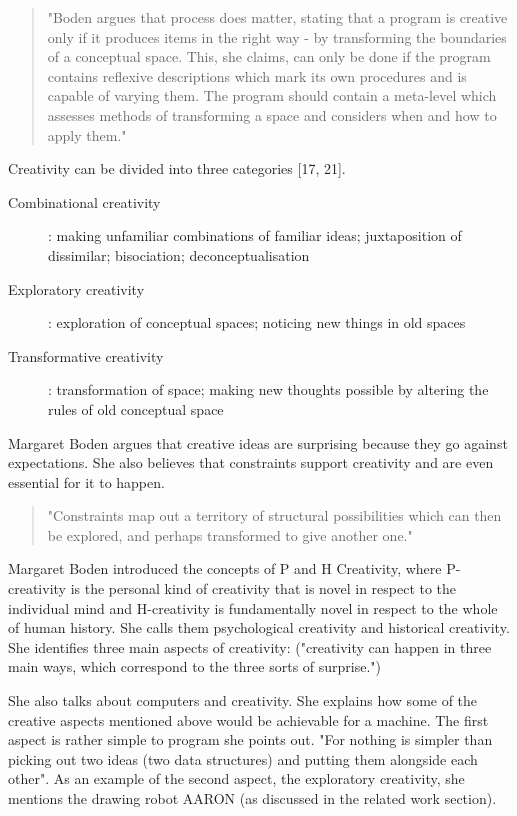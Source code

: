 \begin{quote}
  "Boden argues that process does matter, stating that a program is creative only if it produces items in the right way - by transforming the boundaries of a conceptual space. This, she claims, can only be done if the program contains reflexive descriptions which mark its own procedures and is capable of varying them. The program should contain a meta-level which assesses methods of transforming a space and considers when and how to apply them."  \citep[p.8]{Pease2001}
\end{quote}

Creativity can be divided into three categories \citep{Boden2003}[17, 21].

\begin{description}
  \item [Combinational creativity]: making unfamiliar combinations of familiar ideas; juxtaposition of dissimilar; bisociation; deconceptualisation
  \item [Exploratory creativity]: exploration of conceptual spaces; noticing new things in old spaces
  \item [Transformative creativity]: transformation of space; making new thoughts possible by altering the rules of old conceptual space
\end{description}

Margaret Boden \citep{Boden2003} argues that creative ideas are surprising because they go against expectations. She also believes that constraints support creativity and are even essential for it to happen.

\begin{quote}
  "Constraints map out a territory of structural possibilities which can then be explored, and perhaps transformed to give another one."\citep{Boden2003}
\end{quote}

Margaret Boden \citep{Boden2003} introduced the concepts of P and H Creativity, where P-creativity is the personal kind of creativity that is novel in respect to the individual mind and H-creativity is fundamentally novel in respect to the whole of human history. She calls them psychological creativity and historical creativity. She identifies three main aspects of creativity: ("creativity can happen in three main ways, which correspond to the three sorts of surprise.")

She also talks about computers and creativity. She explains how some of the creative aspects mentioned above would be achievable for a machine.  The first aspect is rather simple to program she points out. "For nothing is simpler than picking out two ideas (two data structures) and putting them alongside each other". As an example of the second aspect, the exploratory creativity, she mentions the drawing robot AARON (as discussed in the related work section).


